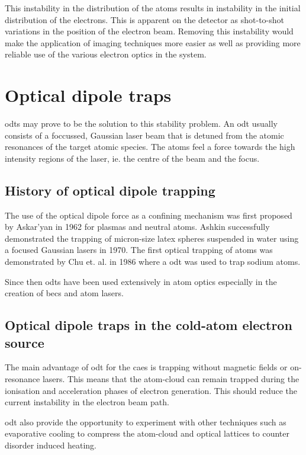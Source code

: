 This instability in the distribution of the atoms results in instability in the initial distribution of the electrons. This is apparent on the detector as shot-to-shot variations in the position of the electron beam. Removing this instability would make the application of imaging techniques more easier as well as providing more reliable use of the various electron optics in the system.

\section{Optical dipole traps}

\Glspl{odt} may prove to be the solution to this stability problem. An \gls{odt} usually consists of a foccussed, Gaussian laser beam that is detuned from the atomic resonances of the target atomic species. The atoms feel a force towards the high intensity regions of the laser, ie. the centre of the beam and the focus.

\subsection{History of optical dipole trapping}
The use of the optical dipole force as a confining mechanism was first proposed by Askar'yan in 1962\cite{askaryan_effects_1962} for plasmas and neutral atoms. Ashkin successfully demonstrated the trapping of micron-size latex spheres suspended in water using a focused Gaussian lasers in 1970\cite{ashkin_acceleration_1970}. The first optical trapping of atoms was demonstrated by Chu et. al. in 1986\cite{chu_experimental_1986} where a \gls{odt} was used to trap sodium atoms.

Since then \glspl{odt} have been used extensively in atom optics especially in the creation of \glspl{bec} and atom lasers.

\subsection{Optical dipole traps in the cold-atom electron source}

The main advantage of \gls{odt} for the \gls{caes} is trapping without magnetic fields or on-resonance lasers. This means that the atom-cloud can remain trapped during the ionisation and acceleration phases of electron generation. This should reduce the current instability in the electron beam path.

\Gls{odt} also provide the opportunity to experiment with other techniques such as evaporative cooling to compress the atom-cloud and optical lattices\cite{fallani_bose-einstein_2005} to counter disorder induced heating. 



